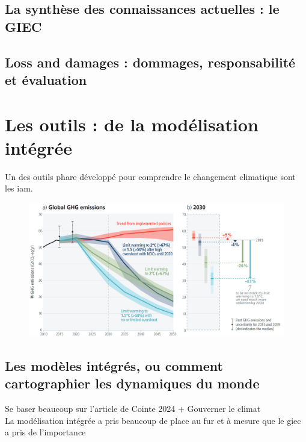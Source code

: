 \subsection{La synthèse des connaissances actuelles : le GIEC}
\label{sect:1.2.3}

\subsection{Loss and damages : dommages, responsabilité et évaluation}
\label{sect:1.2.4}

\section{Les outils : de la modélisation intégrée}
\label{sect:1.3}

Un des outils phare développé pour comprendre le changement climatique sont les \gls{iam}.

\begin{figure}
    \centering
    \includegraphics[width=0.9\linewidth]{figures/spm2_5.png}
    \label{fig:ipcc-pathways}
\end{figure}


\subsection{Les modèles intégrés, ou comment cartographier les dynamiques du monde}
\label{sect:1.3.1}

Se baser beaucoup sur l'article de Cointe 2024 + Gouverner le climat \\

La modélisation intégrée a pris beaucoup de place au fur et à mesure que le giec a pris de l'importance

